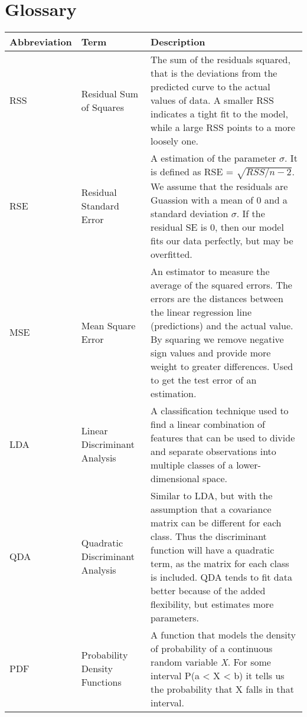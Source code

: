 \chapter*{Glossary}

\newcolumntype{b}{X}

\begin{table}[H]
	\centering
	\begin{tabularx}{\linewidth}{smb}
		\hline
		\textbf{Abbreviation} 	& \textbf{Term} 					& \textbf{Description} 		\\ \hline
		RSS 					& Residual Sum of Squares			& The sum of the residuals squared, that is the deviations from the predicted curve to the actual values of data. A smaller RSS indicates a tight fit to the model, while a large RSS points to a more loosely one. \\ \hline
		RSE 					& Residual Standard Error			& A estimation of the parameter $\sigma$. It is defined as RSE = $\sqrt{RSS/n-2}$. We assume that the residuals are Guassion with a mean of 0 and a standard deviation $\sigma$. If the residual SE is 0, then our model fits our data perfectly, but may be overfitted.  \\ \hline
		MSE 					& Mean Square Error					& An estimator to measure the average of the squared errors. The errors are the distances between the linear regression line (predictions) and the actual value. By squaring we remove negative sign values and provide more weight to greater differences. Used to get the test error of an estimation. \\ \hline
		LDA 					& Linear Discriminant Analysis		& A classification technique used to find a linear combination of features that can be used to divide and separate observations into multiple classes of a lower-dimensional space. \\ \hline
		QDA 					& Quadratic Discriminant Analysis	& Similar to LDA, but with the assumption that a covariance matrix can be different for each class. Thus the discriminant function will have a quadratic term, as the matrix for each class is included. QDA tends to fit data better because of the added flexibility, but estimates more parameters. \\ \hline
		PDF						& Probability Density Functions		& A function that models the density of probability of a continuous random variable \textit{X}. For some interval P(a < X < b) it tells us the probability that X falls in that interval. \\ \hline

\end{tabularx}
\end{table}
